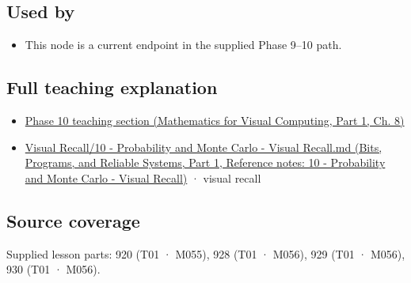 \subsection{Used by}\label{appendix-f0437ea55a47-used-by}

\hypertarget{appendix-f0437ea55a47-used-by}{}

\begin{itemize}
\tightlist
\item
  This node is a current endpoint in the supplied Phase 9--10 path.
\end{itemize}

\subsection{Full teaching explanation}\label{appendix-f0437ea55a47-full-teaching-explanation}

\hypertarget{appendix-f0437ea55a47-full-teaching-explanation}{}

\begin{itemize}
\tightlist
\item
  \href{../02-Mathematics-for-Visual-Computing-P01/main.pdf\#nameddest=02-foundations-ii-ch024-waiting-times-event-counts-and-covariance-geometry}{Phase 10 teaching section (Mathematics for Visual Computing, Part 1, Ch. 8)}
\item
  \href{../01-Bits-Programs-and-Reliable-Systems-P01/main.pdf\#nameddest=appendix-cb5af353ef77}{Visual Recall/10 - Probability and Monte Carlo - Visual Recall.md (Bits, Programs, and Reliable Systems, Part 1, Reference notes: 10 - Probability and Monte Carlo - Visual Recall)} · visual recall
\end{itemize}

\subsection{Source coverage}\label{appendix-f0437ea55a47-source-coverage}

\hypertarget{appendix-f0437ea55a47-source-coverage}{}

Supplied lesson parts: 920 (T01 · M055), 928 (T01 · M056), 929 (T01 · M056), 930 (T01 · M056).
